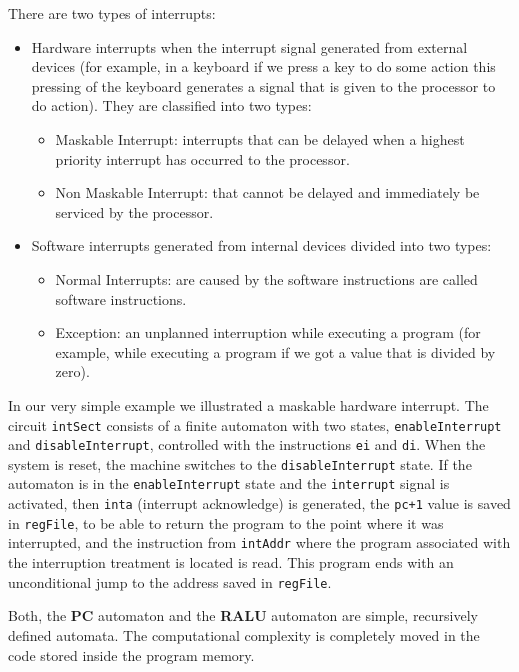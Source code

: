There are two types of interrupts:
\begin{itemize}
\item Hardware interrupts
when the interrupt signal generated from external devices (for example, in a keyboard if we press a key to do some action this pressing of the keyboard generates a signal that is given to the processor to do action). They are classified into two types:
\begin{itemize}
    \item Maskable Interrupt: interrupts that can be delayed when a highest priority interrupt has occurred to the processor.

    \item Non Maskable Interrupt: that cannot be delayed and immediately be serviced by the processor.
\end{itemize}
\item Software interrupts generated from internal devices  divided into two types:
\begin{itemize}
    \item Normal Interrupts: are caused by the software instructions are called software instructions.
    \item Exception: an unplanned interruption while executing a program (for example, while executing a program if we got a value that is divided by zero).
\end{itemize}
\end{itemize}

In our very simple example we illustrated a maskable hardware interrupt. The circuit {\tt intSect} consists of a finite automaton with two states, {\tt enableInterrupt} and {\tt disableInterrupt}, controlled with the instructions {\tt ei} and {\tt di}. When the system is reset, the machine switches to the {\tt disableInterrupt} state. If the automaton is in the {\tt enableInterrupt} state and the {\tt interrupt} signal is activated, then {\tt inta} (interrupt acknowledge) is generated, the {\tt pc+1} value is saved in {\tt regFile}, to be able to return the program to the point where it was interrupted, and  the instruction from {\tt intAddr} where the program associated with the interruption treatment is located is read. This program ends with an unconditional jump to the address saved in {\tt regFile}.

\bigskip


Both, the {\bf PC} automaton and the {\bf RALU} automaton are
simple, recursively defined automata. The computational complexity
is completely moved in the code stored inside the program memory.

